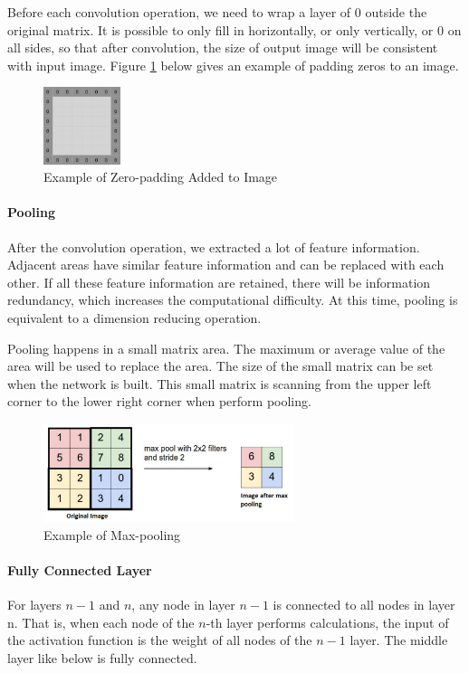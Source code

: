 Before each convolution operation, we need to wrap a layer of 0 outside the original matrix. It is possible to only fill in horizontally, or only vertically, or 0 on all sides, so that after convolution, the size of output image will be consistent with input image. Figure \ref{fig:padding} below gives an example of padding zeros to an image.

\begin{figure}[h!]
\centering
\includegraphics[width=0.2\textwidth]{zeropadding.pdf}
\caption{Example of Zero-padding Added to Image \cite{pooling}}
\label{fig:padding}
\end{figure}

\paragraph{Pooling}
After the convolution operation, we extracted a lot of feature information. Adjacent areas have similar feature information and can be replaced with each other. If all these feature information are retained, there will be information redundancy, which increases the computational difficulty. At this time, pooling is equivalent to a dimension reducing operation. 

Pooling happens in a small matrix area. The maximum or average value of the area will be used to replace the area. The size of the small matrix can be set when the network is built. This small matrix is scanning from the upper left corner to the lower right corner when perform pooling.

\begin{figure}[h!]
\centering
\includegraphics[width=0.65\textwidth]{pooling.pdf}
\caption{Example of Max-pooling \cite{pooling}}
\label{fig:pooling}
\end{figure}

\paragraph{Fully Connected Layer}
For layers $n-1$ and $n$, any node in layer $n-1$ is connected to all nodes in layer n. That is, when each node of the $n$-th layer performs calculations, the input of the activation function is the weight of all nodes of the $n-1$ layer. The middle layer like below is fully connected.

